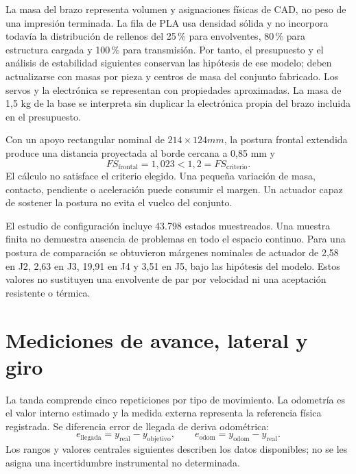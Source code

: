 La masa del brazo representa volumen y asignaciones físicas de CAD, no peso de una impresión terminada. La fila de PLA usa densidad sólida y no incorpora todavía la distribución de rellenos del 25\,\% para envolventes, 80\,\% para estructura cargada y 100\,\% para transmisión. Por tanto, el presupuesto y el análisis de estabilidad siguientes conservan las hipótesis de ese modelo; deben actualizarse con masas por pieza y centros de masa del conjunto fabricado. Los servos y la electrónica se representan con propiedades aproximadas. La masa de 1,5 kg de la base se interpreta sin duplicar la electrónica propia del brazo incluida en el presupuesto.

Con un apoyo rectangular nominal de $214\times124\unit{mm}$, la postura frontal extendida produce una distancia proyectada al borde cercana a 0,85 mm y
\begin{equation}
FS_{\mathrm{frontal}}=1{,}023<1{,}2=FS_{\mathrm{criterio}}.
\end{equation}
El cálculo no satisface el criterio elegido. Una pequeña variación de masa, contacto, pendiente o aceleración puede consumir el margen. Un actuador capaz de sostener la postura no evita el vuelco del conjunto.


El estudio de configuración incluye 43.798 estados muestreados. Una muestra finita no demuestra ausencia de problemas en todo el espacio continuo. Para una postura de comparación se obtuvieron márgenes nominales de actuador de 2,58 en J2, 2,63 en J3, 19,91 en J4 y 3,51 en J5, bajo las hipótesis del modelo. Estos valores no sustituyen una envolvente de par por velocidad ni una aceptación resistente o térmica.

\section{Mediciones de avance, lateral y giro}
La tanda comprende cinco repeticiones por tipo de movimiento. La odometría es el valor interno estimado y la medida externa representa la referencia física registrada. Se diferencia error de llegada de deriva odométrica:
\begin{equation}
e_{\mathrm{llegada}}=y_{\mathrm{real}}-y_{\mathrm{objetivo}},
\qquad e_{\mathrm{odom}}=y_{\mathrm{odom}}-y_{\mathrm{real}}.
\end{equation}
Los rangos y valores centrales siguientes describen los datos disponibles; no se les asigna una incertidumbre instrumental no determinada.

